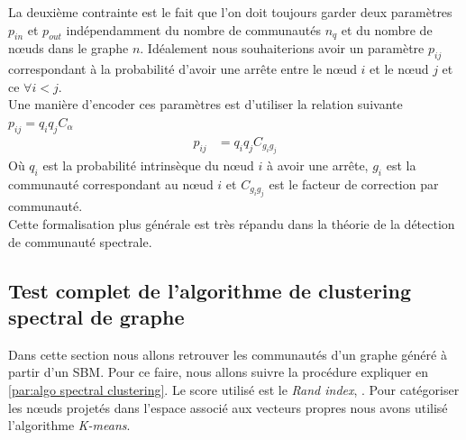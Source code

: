 La deuxième contrainte est le fait que l'on doit toujours garder deux paramètres $p_{in}$ et $p_{out}$ indépendamment du nombre de communautés $n_q$ et du nombre de nœuds dans le graphe $n$.
Idéalement nous souhaiterions avoir un paramètre $p_{ij}$ correspondant à la probabilité d'avoir une arrête entre le nœud $i$ et le nœud $j$ et ce $\forall i<j$.\\
Une manière d'encoder ces paramètres est d'utiliser la relation suivante $p_{ij} = q_iq_jC_{\alpha}$
\begin{align}
	p_{ij} &= q_iq_jC_{g_ig_j}
\end{align}
Où $q_i$ est la probabilité intrinsèque du nœud $i$ à avoir une arrête, $g_i$ est la communauté correspondant au nœud $i$ et $C_{g_ig_j}$ est le facteur de correction par communauté.\\
Cette formalisation plus générale est très répandu dans la théorie de la détection de communauté spectrale.

\subsection{Test complet de l’algorithme de clustering spectral de graphe}
Dans cette section nous allons retrouver les communautés d'un graphe généré à partir d'un SBM.
Pour ce faire, nous allons suivre la procédure expliquer en \ref{par:algo spectral clustering}.
Le score utilisé est le \textit{Rand index}, \cite[p.78 eq.(88)]{Community_detection_in_graphs}.
Pour catégoriser les nœuds projetés dans l'espace associé aux vecteurs propres nous avons utilisé l'algorithme \textit{K-means}.\\

